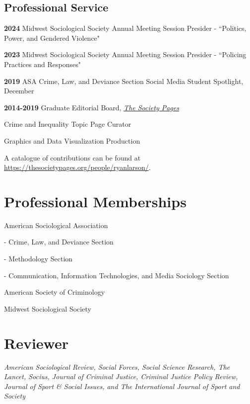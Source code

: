 \documentclass[letterpaper]{article}
\newenvironment{publist}{%
  \begin{list}{}{%
    \setlength{\leftmargin}{0cm}   %
    \setlength{\labelwidth}{2cm}     %
    \setlength{\labelsep}{0.5cm}     %
  }%
}{%
  \end{list}%
}
\renewenvironment{itemize}{
  \begin{list}{}{
    \setlength{\leftmargin}{1.5em}
  }
}{
  \end{list}
}
\begin{document}
\subsection*{Professional Service}

\begin{publist}

\item[\textbf{2024}] Midwest Sociological Society Annual Meeting Session Presider - ``Politics, Power, and Gendered Violence"

\item[\textbf{2023}] Midwest Sociological Society Annual Meeting Session Presider - ``Policing Practices and Responses"

\item[\textbf{2019}] ASA Crime, Law, and Deviance Section Social Media Student Spotlight, December

\item[\textbf{2014-2019}]  Graduate Editorial Board, \href{http://thesocietypages.org/}{\textit{The Society Pages}}
\begin{itemize}
\item Crime and Inequality Topic Page Curator
\item Graphics and Data Visualization Production
\item A catalogue of contributions can be found at \href{https://thesocietypages.org/people/ryanlarson/}{https://thesocietypages.org/people/ryanlarson/}.
\end{itemize}

\end{publist}


\section*{\textbf{Professional Memberships}}
\begin{publist}

\item American Sociological Association
\begin{itemize}
\item - Crime, Law, and Deviance Section
\item - Methodology Section
\item - Communication, Information Technologies, and Media Sociology Section
\end{itemize}
\item American Society of Criminology
\item Midwest Sociological Society

\end{publist}

\section*{\textbf{Reviewer}}

\textit{American Sociological Review, Social Forces, Social Science Research, The Lancet, Socius, Journal of Criminal Justice, Criminal Justice Policy Review, Journal of Sport \& Social Issues, and The International Journal of Sport and Society}
\end{document}
